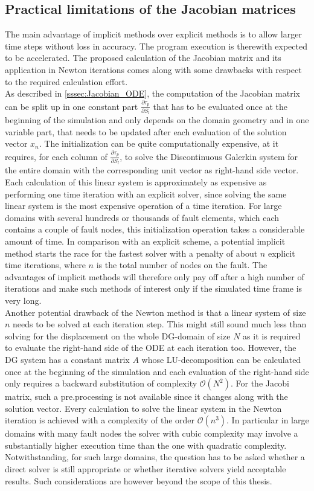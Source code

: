\subsection{Practical limitations of the Jacobian matrices}
The main advantage of implicit methods over explicit methods is to allow larger time steps without loss in accuracy. The program execution is therewith expected to be accelerated. The proposed calculation of the Jacobian matrix and its application in Newton iterations comes along with some drawbacks with respect to the required calculation effort. \\
As described in \autoref{sssec:Jacobian_ODE}, the computation of the Jacobian matrix can be split up in one constant part $\frac{\partial \tau_p}{\partial S_l}$ that has to be evaluated once at the beginning of the simulation and only depends on the domain geometry and in one variable part, that needs to be updated after each evaluation of the solution vector $x_n$. The initialization can be quite computationally expensive, at it requires, for each column of $\frac{\partial \tau_p}{\partial S_l}$, to solve the Discontinuous Galerkin system for the entire domain with the corresponding unit vector as right-hand side vector. Each calculation of this linear system is approximately as expensive as performing one time iteration with an explicit solver, since solving the same linear system is the most expensive operation of a time iteration. For large domains with several hundreds or thousands of fault elements, which each contains a couple of fault nodes, this initialization operation takes a considerable amount of time. In comparison with an explicit scheme, a potential implicit method starts the race for the fastest solver with a penalty of about $n$ explicit time iterations, where $n$ is the total number of nodes on the fault. The advantages of implicit methods will therefore only pay off after a high number of iterations and make such methods of interest only if the simulated time frame is very long. \\
Another potential drawback of the Newton method is that a linear system of size $n$ needs to be solved at each iteration step. This might still sound much less than solving for the displacement on the whole DG-domain of size $N$ as it is required to evaluate the right-hand side of the ODE at each iteration too. However, the DG system has a constant matrix $A$ whose LU-decomposition can be calculated once at the beginning of the simulation and each evaluation of the right-hand side only requires a backward substitution of complexity $\mathcal{O}\left(N^2\right)$. For the Jacobi matrix, such a pre.processing is not available since it changes along with the solution vector. Every calculation to solve the linear system in the Newton iteration is achieved with a complexity of the order $\mathcal{O}\left(n^3\right)$. In particular in large domains with many fault nodes the solver with cubic complexity may involve a substantially higher execution time than the one with quadratic complexity. Notwithstanding, for such large domains, the question has to be asked whether a direct solver is still appropriate or whether iterative solvers yield acceptable results. Such considerations are however beyond the scope of this thesis.

